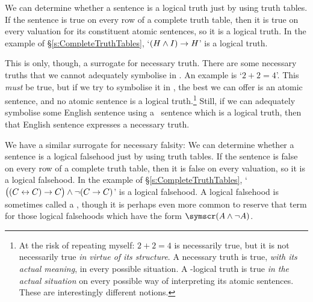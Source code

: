 We can determine whether a sentence is a logical truth just by using truth tables. If the sentence is true on every row of a complete truth table, then it is true on every valuation for its constituent atomic sentences, so it is a logical truth. In the example of §\ref{s:CompleteTruthTables}, `$(H \wedge I) \rightarrow H$' is a logical truth. 


This is only, though, a surrogate for necessary truth. There are some necessary truths that we cannot adequately symbolise in \TFL. An example is `$2 + 2 = 4$'. This \emph{must} be true, but if we try to symbolise it in \TFL, the best we can offer is an atomic sentence, and no atomic sentence is a logical truth.\footnote{At the risk of repeating myself: $2+2=4$ is necessarily true, but it is not necessarily true \emph{in virtue of its structure}. A necessary truth is true, \emph{with its actual meaning}, in every possible situation. A \TFL-logical truth is true \emph{in the actual situation} on every possible way of interpreting its atomic sentences. These are interestingly different notions.} Still, if we can adequately symbolise some English sentence using a \TFL\ sentence which is a logical truth, then that English sentence expresses a necessary truth.

We have a similar surrogate for necessary falsity:
We can determine whether a sentence is a logical falsehood just by using truth tables. If the sentence is false on every row of a complete truth table, then it is false on every valuation, so it is a logical falsehood. In the example of §\ref{s:CompleteTruthTables}, `$\bigl( (C\leftrightarrow C) \rightarrow C\bigr)  \wedge \neg(C \rightarrow C)$' is a logical falsehood. A logical falsehood is sometimes called a , though it is perhaps even more common to reserve that term for those logical falsehoods which have the form $\meta{(A \eand \enot A)}$.


